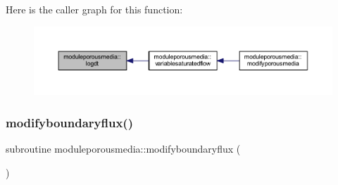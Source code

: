 Here is the caller graph for this function\+:\nopagebreak
\begin{figure}[H]
\begin{center}
\leavevmode
\includegraphics[width=350pt]{namespacemoduleporousmedia_aefd72c2c51be03528321ec53d37a595c_icgraph}
\end{center}
\end{figure}
\mbox{\label{namespacemoduleporousmedia_a38214dbc89926ed05dfa7d3831f6fc5a}} 
\subsubsection{\texorpdfstring{modifyboundaryflux()}{modifyboundaryflux()}}
{\footnotesize\ttfamily subroutine moduleporousmedia\+::modifyboundaryflux (\begin{DoxyParamCaption}{ }\end{DoxyParamCaption})\hspace{0.3cm}{\ttfamily [private]}}

